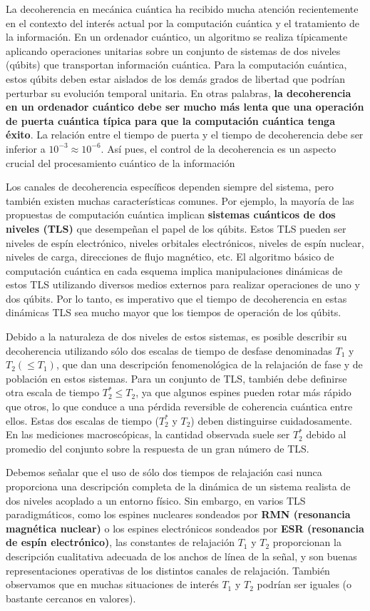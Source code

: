 \documentclass[a4paper,11pt]{book} %
\numberwithin{equation}{chapter}
\begin{document}
La decoherencia en mecánica cuántica ha recibido mucha atención recientemente en el contexto del interés actual por la computación cuántica y el tratamiento de la información. En un ordenador cuántico, un algoritmo se realiza típicamente aplicando operaciones unitarias sobre un conjunto de sistemas de dos niveles (qúbits) que transportan información cuántica. Para la computación cuántica, estos qúbits deben estar aislados de los demás grados de libertad que podrían perturbar su evolución temporal unitaria. En otras palabras, \textbf{la decoherencia en un ordenador cuántico debe ser mucho más lenta que una operación de puerta cuántica típica para que la computación cuántica tenga éxito}. La relación entre el tiempo de puerta y el tiempo de decoherencia debe ser inferior a $10^{-3} \approx 10^{-6}$. Así pues, el control de la decoherencia es un aspecto crucial del procesamiento cuántico de la información

Los canales de decoherencia específicos dependen siempre del sistema, pero también existen muchas características comunes. Por ejemplo, la mayoría de las propuestas de computación cuántica implican \textbf{sistemas cuánticos de dos niveles (TLS)} que desempeñan el papel de los qúbits. Estos TLS pueden ser niveles de espín electrónico, niveles orbitales electrónicos, niveles de espín nuclear, niveles de carga, direcciones de flujo magnético, etc. El algoritmo básico de computación cuántica en cada esquema implica manipulaciones dinámicas de estos TLS utilizando diversos medios externos para realizar operaciones de uno y dos qúbits. Por lo tanto, es imperativo que el tiempo de decoherencia en estas dinámicas TLS sea mucho mayor que los tiempos de operación de los qúbits.

Debido a la naturaleza de dos niveles de estos sistemas, es posible describir su decoherencia utilizando sólo dos escalas de tiempo de desfase denominadas $T_1$ y $T_2(\leq T_1)$, que dan una descripción fenomenológica de la  relajación de fase y de población en estos sistemas. Para un conjunto de TLS, también debe definirse otra escala de tiempo $T^*_2 \leq T_2$, ya que algunos espines pueden rotar más rápido que otros, lo que conduce a una pérdida reversible de coherencia cuántica entre ellos. Estas dos escalas de tiempo ($T^*_2$ y $T_2$) deben distinguirse cuidadosamente. En las mediciones macroscópicas, la cantidad observada suele ser $T^*_2$ debido al promedio del conjunto sobre la respuesta de un gran número de TLS. 

Debemos señalar que el uso de sólo dos tiempos de relajación casi nunca proporciona una descripción completa de la dinámica de un sistema realista de dos niveles acoplado a un entorno físico. Sin embargo, en varios TLS paradigmáticos, como los espines nucleares sondeados por \textbf{RMN (resonancia magnética nuclear)} o los espines electrónicos sondeados por \textbf{ESR (resonancia de espín electrónico)}, las constantes de relajación $T_1$ y $T_2$ proporcionan la descripción cualitativa adecuada de los anchos de línea de la señal, y son buenas representaciones operativas de los distintos canales de relajación. También observamos que en muchas situaciones de interés $T_1$ y $T_2$ podrían ser iguales (o bastante cercanos en valores).
\end{document}
